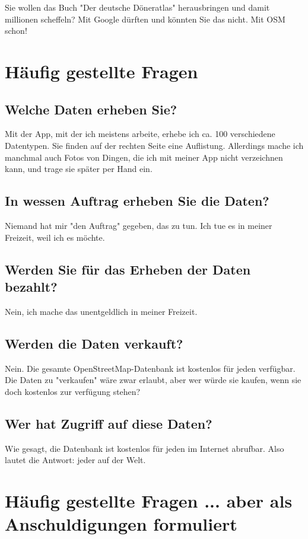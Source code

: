 \documentclass[10pt,foldmark,notumble]{leaflet}
\begin{document}
    Sie wollen das Buch "Der deutsche Döneratlas" herausbringen und damit millionen scheffeln? Mit Google dürften und könnten Sie das nicht. Mit OSM schon!


    \section{Häufig gestellte Fragen}
    \subsection{Welche Daten erheben Sie?}
    Mit der App, mit der ich meistens arbeite, erhebe ich ca. 100 verschiedene Datentypen. Sie finden auf der rechten Seite eine Auflistung. Allerdings mache ich manchmal auch Fotos von Dingen, die ich mit meiner App nicht verzeichnen kann, und trage sie später per Hand ein.

    \subsection{In wessen Auftrag erheben Sie die Daten?}
    Niemand hat mir "den Auftrag" gegeben, das zu tun. Ich tue es in meiner Freizeit, weil ich es möchte.

    \subsection{Werden Sie für das Erheben der Daten bezahlt?}
    Nein, ich mache das unentgeldlich in meiner Freizeit.

    \subsection{Werden die Daten verkauft?}
    Nein. Die gesamte OpenStreetMap-Datenbank ist kostenlos für jeden verfügbar. Die Daten zu "verkaufen" wäre zwar erlaubt, aber wer würde sie kaufen, wenn sie doch kostenlos zur verfügung stehen?

    \subsection{Wer hat Zugriff auf diese Daten?}
    Wie gesagt, die Datenbank ist kostenlos für jeden im Internet abrufbar. Also lautet die Antwort: jeder auf der Welt.


    \section{Häufig gestellte Fragen {\small ... aber als Anschuldigungen formuliert}}
\end{document}
